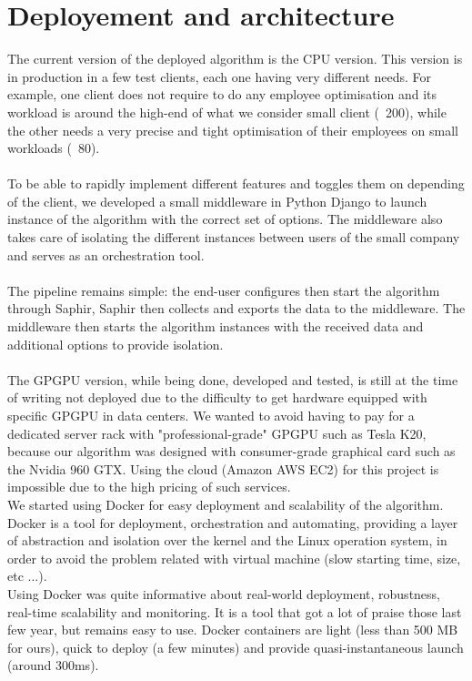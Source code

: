 \documentclass[12pt]{memoir}
\begin{document}
\newpage

\section{Deployement and architecture}

The current version of the deployed algorithm is the CPU version. This version is in
production in a few test clients, each one having very different needs. For example,
one client does not require to do any employee optimisation and its workload is
around the high-end of what we consider small client (~200), while the other needs a
very precise and tight optimisation of their employees on small workloads (~80).\\
\\
To be able to rapidly implement different features and toggles them on depending of the client,
we developed a small middleware in Python Django to launch instance of the algorithm
with the correct set of options. The middleware also takes care of isolating the
different instances between users of the small company and serves as an orchestration
tool.\\
\\
The pipeline remains simple: the end-user configures then start the algorithm through
Saphir, Saphir then collects and exports the data to the middleware. The middleware
then starts the algorithm instances with the received data and additional options to
provide isolation.\\
\\
The GPGPU version, while being done, developed and tested, is still at the time of
writing not deployed due to the difficulty to get hardware equipped with specific
GPGPU in data centers. We wanted to avoid having to pay for a dedicated server rack
with "professional-grade" GPGPU such as Tesla K20, because our algorithm was
designed with consumer-grade graphical card such as the Nvidia 960 GTX. Using the
cloud (Amazon AWS EC2) for this project is impossible due to the high pricing
of such services.
\\
We started using Docker for easy deployment and scalability of the algorithm. Docker
is a tool for deployment, orchestration and automating, providing a layer of
abstraction and isolation over the kernel and the Linux operation system, in order
to avoid the problem related with virtual machine (slow starting time, size, etc
...). \\
Using Docker was quite informative about real-world deployment, robustness,
real-time scalability and monitoring. It is a tool that got a lot of praise those
last few year, but remains easy to use. Docker containers are light (less than 500
MB for ours), quick to deploy (a few minutes) and provide quasi-instantaneous launch
(around 300ms).
\end{document}
